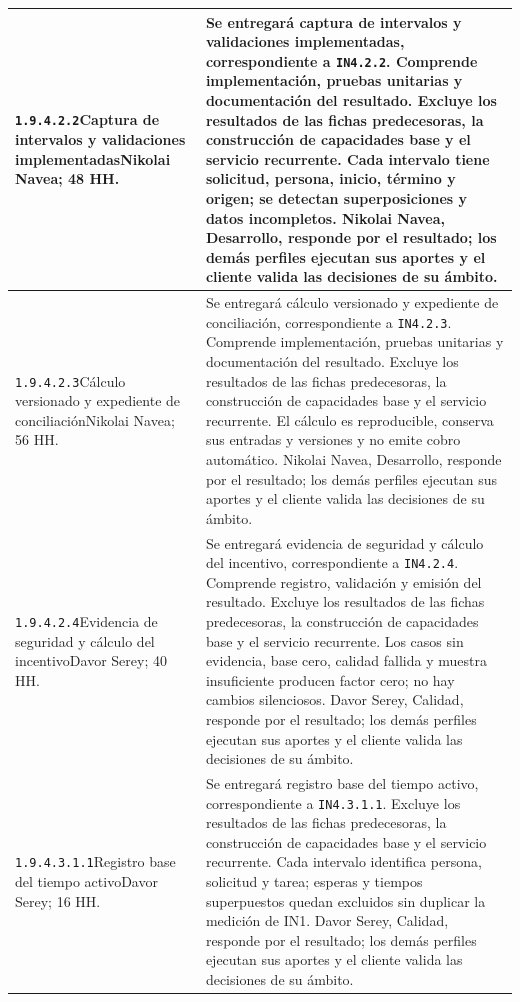 \begin{longtable}{L{52mm}L{91mm}}
\texttt{1.\allowbreak{}9.\allowbreak{}4.\allowbreak{}2.\allowbreak{}2}\newline Captura de intervalos y validaciones implementadas\newline Nikolai Navea; 48 HH. & Se entregará captura de intervalos y validaciones implementadas, correspondiente a \texttt{IN4.2.2}. Comprende implementación, pruebas unitarias y documentación del resultado. Excluye los resultados de las fichas predecesoras, la construcción de capacidades base y el servicio recurrente.  Cada intervalo tiene solicitud, persona, inicio, término y origen; se detectan superposiciones y datos incompletos. Nikolai Navea, Desarrollo, responde por el resultado; los demás perfiles ejecutan sus aportes y el cliente valida las decisiones de su ámbito.\\\hline
\texttt{1.\allowbreak{}9.\allowbreak{}4.\allowbreak{}2.\allowbreak{}3}\newline Cálculo versionado y expediente de conciliación\newline Nikolai Navea; 56 HH. & Se entregará cálculo versionado y expediente de conciliación, correspondiente a \texttt{IN4.2.3}. Comprende implementación, pruebas unitarias y documentación del resultado. Excluye los resultados de las fichas predecesoras, la construcción de capacidades base y el servicio recurrente.  El cálculo es reproducible, conserva sus entradas y versiones y no emite cobro automático. Nikolai Navea, Desarrollo, responde por el resultado; los demás perfiles ejecutan sus aportes y el cliente valida las decisiones de su ámbito.\\\hline
\texttt{1.\allowbreak{}9.\allowbreak{}4.\allowbreak{}2.\allowbreak{}4}\newline Evidencia de seguridad y cálculo del incentivo\newline Davor Serey; 40 HH. & Se entregará evidencia de seguridad y cálculo del incentivo, correspondiente a \texttt{IN4.2.4}. Comprende registro, validación y emisión del resultado. Excluye los resultados de las fichas predecesoras, la construcción de capacidades base y el servicio recurrente.  Los casos sin evidencia, base cero, calidad fallida y muestra insuficiente producen factor cero; no hay cambios silenciosos. Davor Serey, Calidad, responde por el resultado; los demás perfiles ejecutan sus aportes y el cliente valida las decisiones de su ámbito.\\\hline
\texttt{1.\allowbreak{}9.\allowbreak{}4.\allowbreak{}3.\allowbreak{}1.\allowbreak{}1}\newline Registro base del tiempo activo\newline Davor Serey; 16 HH. & Se entregará registro base del tiempo activo, correspondiente a \texttt{IN4.3.1.1}. Excluye los resultados de las fichas predecesoras, la construcción de capacidades base y el servicio recurrente.  Cada intervalo identifica persona, solicitud y tarea; esperas y tiempos superpuestos quedan excluidos sin duplicar la medición de IN1. Davor Serey, Calidad, responde por el resultado; los demás perfiles ejecutan sus aportes y el cliente valida las decisiones de su ámbito.\\\hline

\end{longtable}
